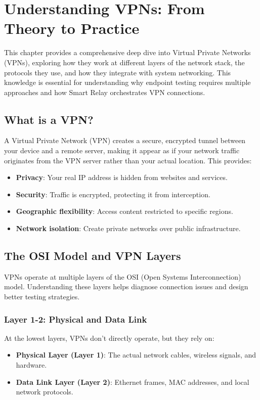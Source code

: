 \chapter{Understanding VPNs: From Theory to Practice}

This chapter provides a comprehensive deep dive into Virtual Private Networks (VPNs), exploring how they work at different layers of the network stack, the protocols they use, and how they integrate with system networking. This knowledge is essential for understanding why endpoint testing requires multiple approaches and how Smart Relay orchestrates VPN connections.

\section{What is a VPN?}

A Virtual Private Network (VPN) creates a secure, encrypted tunnel between your device and a remote server, making it appear as if your network traffic originates from the VPN server rather than your actual location. This provides:

\begin{itemize}
    \item \textbf{Privacy}: Your real IP address is hidden from websites and services.
    \item \textbf{Security}: Traffic is encrypted, protecting it from interception.
    \item \textbf{Geographic flexibility}: Access content restricted to specific regions.
    \item \textbf{Network isolation}: Create private networks over public infrastructure.
\end{itemize}

\section{The OSI Model and VPN Layers}

VPNs operate at multiple layers of the OSI (Open Systems Interconnection) model. Understanding these layers helps diagnose connection issues and design better testing strategies.

\subsection{Layer 1-2: Physical and Data Link}

At the lowest layers, VPNs don't directly operate, but they rely on:
\begin{itemize}
    \item \textbf{Physical Layer (Layer 1)}: The actual network cables, wireless signals, and hardware.
    \item \textbf{Data Link Layer (Layer 2)}: Ethernet frames, MAC addresses, and local network protocols.
\end{itemize}

